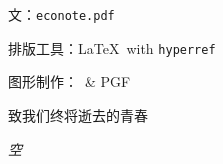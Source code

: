 \begin{titlepage}
\begin{center}
\begin{minipage}[t]{0.5\textwidth}
{\sffamily 文}：\texttt{econote.pdf}

{\sffamily 排版工具}：{\LaTeX}~with \texttt{hyperref}

{\sffamily 图形制作}：\tikzname~\& \textsc{PGF}
\end{minipage}
\end{center}
\newpage
\thispagestyle{empty}
\begin{center}
\vspace*{40mm}\noindent
\fzsign\LARGE{致我们终将逝去的青春}
\end{center}
\newpage
\thispagestyle{empty}
\hbox{}
\vspace*{\fill}
\begin{center}
\emph{空}
\end{center}
\vspace{\fill}
\end{titlepage}